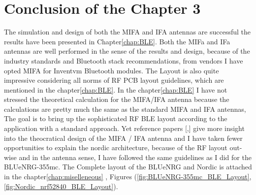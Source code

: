 

\section{Conclusion of the Chapter 3}
The simulation and design of both the MIFA and IFA antennas are successful the results have been presented in Chapter\ref{chap:BLE}.  
Both the MIFa and IFa antennas are well performed in the sense of the results and design, because of the industry standards and Bluetooth stack recommendations, from vendors I have opted MIFA for Inventvm Bluetooth modules. 
The Layout is also quite impressive considering all norms of RF PCB layout guidelines, which are mentioned in the chapter\ref{chap:BLE}.
In the chapter\ref{chap:BLE} I have not stressed the theoretical calculation for the MIFA/IFA antenna because the calculations are pretty much the same as the standard MIFA and IFA antennas, 
The goal is to bring up the sophisticated RF BLE layout according to the application with a standard approach. Yet reference papers [\cite{MIFA_Design_Losito},\cite{MIFA_IFA_difference_Kanan}] give more insight into the theocratical design of the MIFA / IFA antenna and 
I have taken fewer opportunities to explain the nordic architecture, because of the RF layout out-wise and in the antenna sense, I have followed the same guidelines as I did for the BLUeNRG-355mc.
The Complete layout of the BLUeNRG and Nordic is attached in the chapter\ref{chap:miselleneous} , Figures (\ref{fig:BLUeNRG-355mc_BLE_Layout},\ref{fig:Nordic_nrf52840_BLE_Layout}).